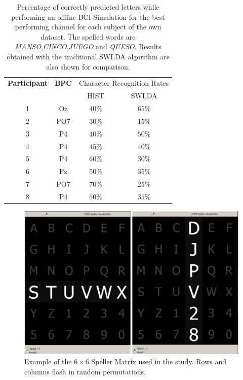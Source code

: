 \documentclass[utf8]{frontiersSCNS} %
\begin{document}
\begin{table}[htb]
\caption{Percentage of correctly predicted letters while performing an offline BCI Simulation for the best performing channel for each subject of the own dataset. The spelled words are \textit{MANSO},\textit{CINCO},\textit{JUEGO} and \textit{QUESO}. Results obtained with the traditional SWLDA algorithm are also shown for comparison.}
\centering
\begin{tabular}{cccc}
\toprule
\textbf{Participant}	&  \textbf{BPC}	& \multicolumn{2}{c}{Character Recognition Rates}\\
	&  	&  HIST & SWLDA  \\
\midrule
1     &     Oz   &     $40\%$  &     $65\%$ \\
2     &     PO7   &     $30\%$ &   $15\%$ \\
3     &     P4   &     $40\%$ &     $50\%$ \\
4     &     P4   &     $45\%$ &     $40\%$ \\
5     &     P4   &      $60\%$ &    $30\%$ \\
6     &     Pz   &      $50\%$ &    $35\%$ \\
7     &     PO7   &      $70\%$ &  $25\%$ \\
8     &     P4   &      $50\%$ &    $35\%$ \\

\end{tabular}
\label{tab:resultsowndataset}
\end{table}


\begin{figure}[h!]
\centering
\includegraphics[width=15cm]{openvibep300matrix.png}
\caption{Example of the $6 \times 6$ Speller Matrix used in the study.  Rows and columns flash in random permutations.}
\label{fig:p300matrix}
\end{figure}
\end{document}
